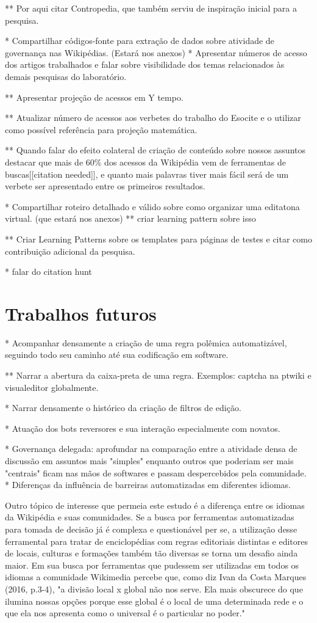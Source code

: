 ** Por aqui citar Contropedia, que também serviu de inspiração inicial para a pesquisa.

* Compartilhar códigos-fonte para extração de dados sobre atividade de governança nas Wikipédias. (Estará nos anexos)
* Apresentar números de acesso dos artigos trabalhados e falar sobre visibilidade dos temas relacionados às demais pesquisas do laboratório.

** Apresentar projeção de acessos em Y tempo.

** Atualizar número de acessos aos verbetes do trabalho do Esocite e o utilizar como possível referência para projeção matemática.

** Quando falar do efeito colateral de criação de conteúdo sobre nossos assuntos destacar que mais de 60\% dos acessos da Wikipédia vem de ferramentas de buscas[[citation needed]], e quanto mais palavras tiver mais fácil será de um verbete ser apresentado entre os primeiros resultados.

* Compartilhar roteiro detalhado e válido sobre como organizar uma editatona virtual. (que estará nos anexos) 
** criar learning pattern sobre isso

** Criar Learning Patterns sobre os templates para páginas de testes e citar como contribuição adicional da pesquisa.

* falar do citation hunt

\section{Trabalhos futuros}

* Acompanhar densamente a criação de uma regra polêmica automatizável, seguindo todo seu caminho até sua codificação em software.

** Narrar a abertura da caixa-preta de uma regra. Exemplos: captcha na ptwiki e visualeditor globalmente.

* Narrar densamente o histórico da criação de filtros de edição.

* Atuação dos bots reversores e sua interação especialmente com novatos.

* Governança delegada: aprofundar na comparação entre a atividade densa de discussão em assuntos mais "simples" enquanto outros que poderiam ser mais "centrais" ficam nas mãos de softwares e passam despercebidos pela comunidade.
* Diferenças da influência de barreiras automatizadas em diferentes idiomas.

Outro tópico de interesse que permeia este estudo é a diferença entre os idiomas da Wikipédia e suas comunidades. Se a busca por ferramentas automatizadas para tomada de decisão já é complexa e questionável per se, a utilização desse ferramental para tratar de enciclopédias com regras editoriais distintas e editores de locais, culturas e formações também tão diversas se torna um desafio ainda maior. Em sua busca por ferramentas que pudessem ser utilizadas em todos os idiomas a comunidade Wikimedia percebe que, como diz Ivan da Costa Marques (2016, p.3-4), "a divisão local x global não nos serve. Ela mais obscurece do que ilumina nossas opções porque esse global é o local de uma determinada rede e o que ela nos apresenta como o universal é o particular no poder."

